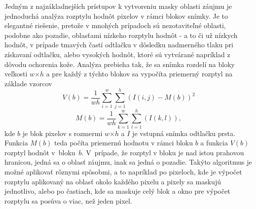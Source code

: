   Jedným z najzákladnejších prístupov k vytvoreniu masky oblasti záujmu je jednoduchá analýza rozptylu hodnôt pixelov v rámci blokov snímky. Je to elegantné
  riešenie, pretože v mnohých prípadoch sú nezotaviteľné oblasti, podobne ako pozadie, oblasťami nízkeho rozptylu hodnôt - a to či už nízkych hodnôt, v prípade
  tmavých častí odtlačku v dôsledku nadmerného tlaku pri získavaní odtlačku, alebo vysokých hodnôt, ktoré sú vytvárané napríklad z dôvodu ochorenia kože.
  Analýza prebieha tak, že sa snímka rozdelí na bloky veľkosti $w$$\times{}$$h$ a pre každý z týchto blokov sa vypočíta priemerný rozptyl na základe
  vzorcov~{\cite{babatunde2012FP_enhancement}}
  \begin{equation}
    V(b) = \frac{1}{wh} \sum_{i=1}^{w}\sum_{j=1}^{h}(I(i,j) - M(b))^2
  \end{equation}
  \begin{equation}
    M(b) = \frac{1}{wh} \sum_{k=1}^{w}\sum_{l=1}^{h}(I(k,l)),
  \end{equation}
  kde $b$ je blok pixelov s rozmermi $w$$\times{}$$h$ a $I$ je vstupná snímka odtlačku prsta. Funkcia $M(b)$ teda počíta priemernú hodnotu v rámci bloku $b$
  a funkcia $V(b)$ rozptyl hodnôt v~bloku~{$b$}. V~prípade, že rozptyl v bloku je nad istou prahovou hranicou, jedná sa
  o oblasť záujmu, inak sa jedná o pozadie. Takýto algoritmus je možné aplikovať rôznymi spôsobmi, a to napríklad po pixeloch, kde je výpočet rozptylu
  aplikovaný na oblasť okolo každého pixelu a pixely sa maskujú jednotlivo, alebo po častiach, kde sa maskuje celý blok a okno pre výpočet rozptylu sa
  posúva o viac, než jeden pixel.

